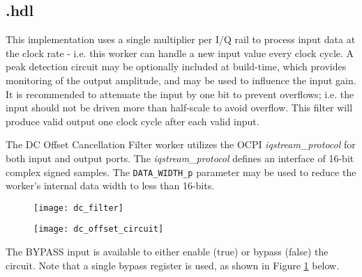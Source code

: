 \subsection*{\comp.hdl}
\begin{flushleft}
	This implementation uses a single multiplier per I/Q rail to process input data at the clock rate - i.e. this worker can handle a new input value every clock cycle. A peak detection circuit may be optionally included at build-time, which provides monitoring of the output amplitude, and may be used to influence the input gain. It is recommended to attenuate the input by one bit to prevent overflows; i.e. the input should not be driven more than half-scale to avoid overflow. This filter will produce valid output one clock cycle after each valid input.\medskip

	The DC Offset Cancellation Filter worker utilizes the OCPI \textit{iqstream\_protocol} for both input and output ports. The \textit{iqstream\_protocol} defines an interface of 16-bit complex signed samples. The \verb+DATA_WIDTH_p+ parameter may be used to reduce the worker's internal data width to less than 16-bits.

	\begin{figure}[ht]
		\centering
		\begin{minipage}{.5\textwidth}
			\centering\captionsetup{type=figure}\texttt{[image: dc\_filter]}
			\label{fig:ideal}
		\end{minipage}%
		\begin{minipage}{.5\textwidth}
			\centering\captionsetup{type=figure}\texttt{[image: dc\_offset\_circuit]}
			\label{fig:circuit}
		\end{minipage}
	\end{figure}
	The BYPASS input is available to either enable (true) or bypass (false) the circuit. Note that a single bypass register is used, as shown in Figure \ref{fig:circuit} below.\medskip
\end{flushleft}

